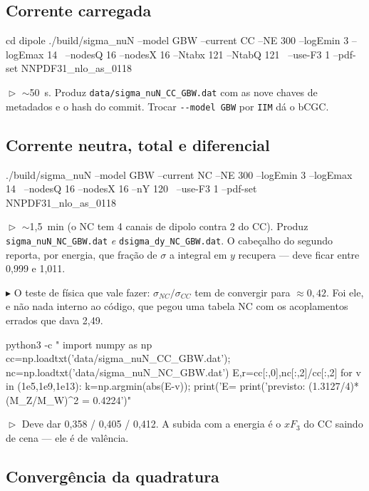 \documentclass[10pt,a4paper]{article}
\newcommand{\teste}[1]{%
  \par\vspace{1pt}\noindent
  {\color{verde}\footnotesize$\vartriangleright$}\hspace{3pt}%
  {\color{cinza}\footnotesize #1}\par\vspace{7pt}}
\newcommand{\aviso}[1]{%
  \par\vspace{1pt}\noindent
  {\color{ferrugem}\footnotesize$\blacktriangleright$}\hspace{3pt}%
  {\color{cinza}\footnotesize #1}\par\vspace{7pt}}
\begin{document}
\subsection{Corrente carregada}

\begin{comando}
cd dipole
./build/sigma_nuN --model GBW --current CC --NE 300 --logEmin 3 --logEmax 14 \
    --nodesQ 16 --nodesX 16 --Ntabx 121 --NtabQ 121 \
    --use-F3 1 --pdf-set NNPDF31_nlo_as_0118
\end{comando}
\teste{$\sim$50~s. Produz \texttt{data/sigma\_nuN\_CC\_GBW.dat} com as
nove chaves de metadados e o hash do commit. Trocar \texttt{-{}-model
GBW} por \texttt{IIM} dá o bCGC.}

\subsection{Corrente neutra, total e diferencial}

\begin{comando}
./build/sigma_nuN --model GBW --current NC --NE 300 --logEmin 3 --logEmax 14 \
    --nodesQ 16 --nodesX 16 --nY 120 \
    --use-F3 1 --pdf-set NNPDF31_nlo_as_0118
\end{comando}
\teste{$\sim$1,5~min (o NC tem 4 canais de dipolo contra 2 do CC).
Produz \texttt{sigma\_nuN\_NC\_GBW.dat} \emph{e}
\texttt{dsigma\_dy\_NC\_GBW.dat}. O cabeçalho do segundo reporta, por
energia, que fração de $\sigma$ a integral em $y$ recupera --- deve
ficar entre 0,999 e 1,011.}

\aviso{O teste de física que vale fazer: $\sigma_{NC}/\sigma_{CC}$ tem de
convergir para $\approx 0{,}42$. Foi ele, e não nada interno ao código,
que pegou uma tabela NC com os acoplamentos errados que dava 2,49.}

\begin{comando}
python3 -c "
import numpy as np
cc=np.loadtxt('data/sigma_nuN_CC_GBW.dat'); nc=np.loadtxt('data/sigma_nuN_NC_GBW.dat')
E,r=cc[:,0],nc[:,2]/cc[:,2]
for v in (1e5,1e9,1e13):
    k=np.argmin(abs(E-v)); print('E=%
print('previsto: (1.3127/4)*(M_Z/M_W)^2 = 0.4224')"
\end{comando}
\teste{Deve dar 0,358 / 0,405 / 0,412. A subida com a energia é o $xF_3$
do CC saindo de cena --- ele é de valência.}

\subsection{Convergência da quadratura}
\end{document}
